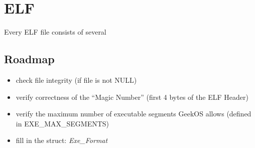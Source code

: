 
%





\section{ELF}
Every ELF file consists of several  








\subsection{Roadmap}
\begin{itemize}
  \item check file integrity (if file is not NULL)
  \item verify correctness of the ``Magic Number'' (first 4 bytes of the ELF Header)%
  \item verify the maximum number of executable segments GeekOS allows  (defined in EXE\_MAX\_SEGMENTS)%
  \item fill in the struct: \textit{Exe\_Format}
\end{itemize}



%

